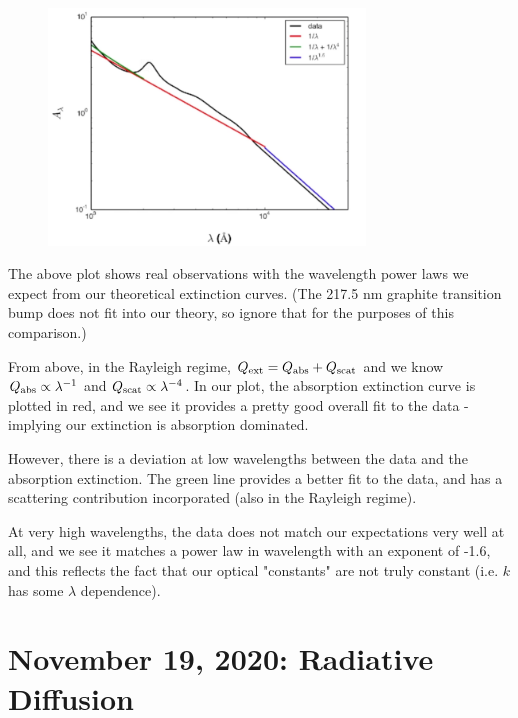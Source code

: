 \documentclass{article}
\begin{document}
\begin{figure}[ht]
    \centering
    \includegraphics[width=0.75\textwidth]{figures/800px-Obsv.png}
    \label{fig:obsv}
\end{figure}

The above plot shows real observations with the wavelength power laws we expect from our theoretical extinction curves. (The 217.5 nm graphite transition bump does not fit into our theory, so ignore that for the purposes of this comparison.)

From above, in the Rayleigh regime, $Q_{\rm{ext}} = Q_{\rm{abs}} + Q_{\rm{scat}}$ and we know $Q_{\rm{abs}} \propto \lambda^{-1}$ and $Q_{\rm{scat}} \propto \lambda^{-4}$. In our plot, the absorption extinction curve is plotted in red, and we see it provides a pretty good overall fit to the data - implying our extinction is absorption dominated. 

However, there is a deviation at low wavelengths between the data and the absorption extinction. The green line provides a better fit to the data, and has a scattering contribution incorporated (also in the Rayleigh regime). 

At very high wavelengths, the data does not match our expectations very well at all, and we see it matches a power law in wavelength with an exponent of -1.6, and this reflects the fact that our optical "constants" are not truly constant (i.e. $k$ has some $\lambda$ dependence). 


\newpage
\section{November 19, 2020: Radiative Diffusion}
\end{document}
